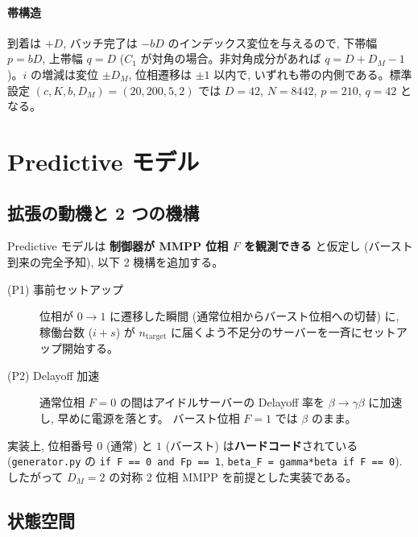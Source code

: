 \documentclass[a4paper,11pt]{article}
\newcommand{\code}[1]{\texttt{#1}}
\begin{document}
\paragraph{帯構造}
到着は $+D$, バッチ完了は $-bD$ のインデックス変位を与えるので,
下帯幅 $p=bD$, 上帯幅 $q=D$ ($C_1$ が対角の場合。非対角成分があれば
$q=D+D_M-1$)。$i$ の増減は変位 $\pm D_M$, 位相遷移は $\pm 1$ 以内で,
いずれも帯の内側である。標準設定 $(c,K,b,D_M)=(20,200,5,2)$ では
$D=42$, $N=8442$, $p=210$, $q=42$ となる。

\section{Predictive モデル}
\label{sec:pred}

\subsection{拡張の動機と 2 つの機構}

Predictive モデルは \textbf{制御器が MMPP 位相 $F$ を観測できる}
と仮定し (バースト到来の完全予知), 以下 2 機構を追加する。

\begin{description}
\item[(P1) 事前セットアップ] 位相が $0\to1$ に遷移した瞬間
  (通常位相からバースト位相への切替) に, 稼働台数 ($i+s$) が
  $n_{\mathrm{target}}$ に届くよう不足分のサーバーを一斉にセットアップ開始する。
\item[(P2) Delayoff 加速] 通常位相 $F=0$ の間はアイドルサーバーの
  Delayoff 率を $\beta\to\gamma\beta$ に加速し, 早めに電源を落とす。
  バースト位相 $F=1$ では $\beta$ のまま。
\end{description}

実装上, 位相番号 $0$ (通常) と $1$ (バースト) は\textbf{ハードコード}されている
(\code{generator.py} の \code{if F == 0 and Fp == 1}, \code{beta\_F = gamma*beta if F == 0}).
したがって $D_M=2$ の対称 2 位相 MMPP を前提とした実装である。

\subsection{状態空間}
\end{document}
